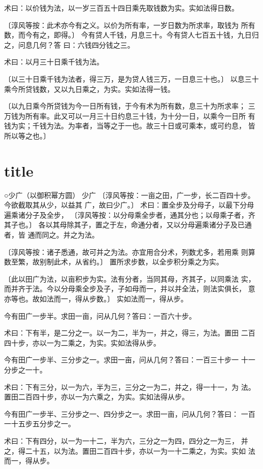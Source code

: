 \documentclass[a4paper,12pt,UTF8,twoside]{ctexbook}
\begin{document}
术曰：以价钱为法，以一岁三百五十四日乘先取钱数为实。实如法得日数。

〔淳风等按：此术亦今有之义。以价为所有率，一岁日数为所求率，取钱为 所有数，而今有之，即得。〕 今有贷人千钱，月息三十。今有贷人七百五十钱，九日归之，问息几何？答 曰：六钱四分钱之三。

术曰：以月三十日乘千钱为法。

〔以三十日乘千钱为法者，得三万，是为贷人钱三万，一日息三十也。〕 以息三十乘今所贷钱数，又以九日乘之，为实。实如法得一钱。

〔以九日乘今所贷钱为今一日所有钱，于今有术为所有数，息三十为所求率； 三万钱为所有率。此又可以一月三十日约息三十钱，为十分一日，以乘今一日所 有钱为实；千钱为法。为率者，当等之于一也。故三十日或可乘本，或可约息， 皆所以等之也。〕 

\chapter{title}
○少广（以御积幂方圆） 少广 〔淳风等按：一亩之田，广一步，长二百四十步。今欲截取其从少，以益其 广，故曰少广。〕 术曰：置全步及分母子，以最下分母遍乘诸分子及全步， 〔淳风等按：以分母乘全步者，通其分也；以母乘子者，齐其子也。〕 各以其母除其子，置之于左，命通分者，又以分母遍乘诸分子及已通者，皆 通而同之。并之为法。

〔淳风等按：诸子悉通，故可并之为法。亦宜用合分术，列数尤多，若用乘 则算数至繁，故别制此术，从省约。〕 置所求步数，以全步积分乘之为实。

〔此以田广为法，以亩积步为实。法有分者，当同其母，齐其子，以同乘法 实，而并齐于法。今以分母乘全步及子，子如母而一，并以并全法，则法实俱长， 意亦等也。故如法而一，得从步数。〕 实如法而一，得从步。

今有田广一步半。求田一亩，问从几何？答曰：一百六十步。

术曰：下有半，是二分之一。以一为二，半为一，并之，得三，为法。置田 二百四十步，亦以一为二乘之，为实。实如法得从步。

今有田广一步半、三分步之一。求田一亩，问从几何？答曰：一百三十步一 十一分步之一十。

术曰：下有三分，以一为六，半为三，三分之一为二，并之，得一十一，为 法。置田二百四十步，亦以一为六乘之，为实。实如法得从步。

今有田广一步半、三分步之一、四分步之一。求田一亩，问从几何？答曰： 一百一十五步五分步之一。

术曰：下有四分，以一为一十二，半为六，三分之一为四，四分之一为三， 并之，得二十五，以为法。置田二百四十步，亦以一为一十二乘之，为实。实如 法而一，得从步。
\end{document}
